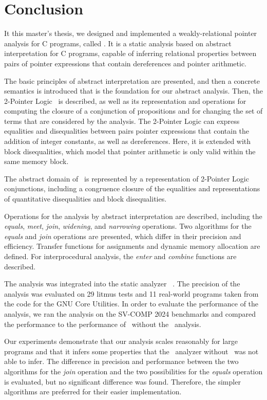 \chapter{Conclusion}\label{chapter:conclusion}

It this master's thesis, we designed and implemented a weakly-relational pointer analysis for C programs, called \cpo.
It is a static analysis based on abstract interpretation for C programs,
capable of inferring relational properties between pairs of pointer expressions that contain dereferences and pointer arithmetic.

The basic principles of abstract interpretation are presented, and then a concrete semantics is introduced that is the foundation for our abstract analysis.
Then, the 2-Pointer Logic~\cite{2pointer} is described, as well as its representation and operations for computing the closure of a conjunction of propositions and for changing the set of terms that are considered by the analysis.
The 2-Pointer Logic can express equalities and disequalities between pairs pointer expressions that contain the addition of integer constants, as well as dereferences.
Here, it is extended with block disequalities, which model that pointer arithmetic is only valid within the same memory block.

The abstract domain of \cpo\ is represented by a representation of 2-Pointer Logic conjunctions, including a congruence closure of the equalities and representations of quantitative disequalities and block disequalities.

Operations for the analysis by abstract interpretation are described, including the \emph{equals}, \emph{meet}, \emph{join}, \emph{widening}, and \emph{narrowing} operations.
Two algorithms for the \emph{equals} and \emph{join} operations are presented, which differ in their precision and efficiency.
Transfer functions for assignments and dynamic memory allocation are defined.
For interprocedural analysis, the \emph{enter} and \emph{combine} functions are described.

The analysis was integrated into the static analyzer \goblint~\cite{goblint}.
The precision of the analysis was evaluated on 29 litmus tests and 11 real-world programs taken from the code for the GNU Core Utilities.
In order to evaluate the performance of the analysis, we ran the analysis on the SV-COMP 2024 benchmarks and compared the performance to the performance of \goblint\ without the \cpo\ analysis.

Our experiments demonstrate that our analysis scales reasonably for large programs and
that it infers some properties that the \goblint\ analyzer without \cpo\ was not able to infer.
The difference in precision and performance between the two algorithms for the \emph{join} operation and the two possibilities for the \emph{equals} operation is evaluated,
but no significant difference was found.
Therefore, the simpler algorithms are preferred for their easier implementation.

